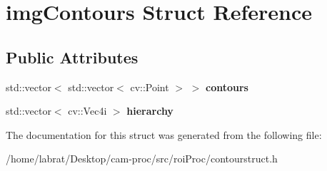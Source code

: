 \hypertarget{structimgContours}{}\section{img\+Contours Struct Reference}
\label{structimgContours}
\subsection*{Public Attributes}
\begin{DoxyCompactItemize}
\item 
std\+::vector$<$ std\+::vector$<$ cv\+::\+Point $>$ $>$ {\bfseries contours}\hypertarget{structimgContours_af411be2ac1cbed5a3b4643aa12967061}{}\label{structimgContours_af411be2ac1cbed5a3b4643aa12967061}

\item 
std\+::vector$<$ cv\+::\+Vec4i $>$ {\bfseries hierarchy}\hypertarget{structimgContours_ab1cb3c6e90a87f05e4f9a35ab534928a}{}\label{structimgContours_ab1cb3c6e90a87f05e4f9a35ab534928a}

\end{DoxyCompactItemize}


The documentation for this struct was generated from the following file\+:\begin{DoxyCompactItemize}
\item 
/home/labrat/\+Desktop/cam-\/proc/src/roi\+Proc/contourstruct.\+h\end{DoxyCompactItemize}
